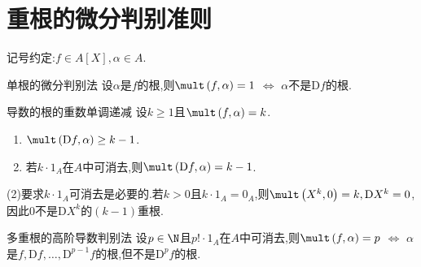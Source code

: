 \section{重根的微分判别准则}

记号约定:$f\in A\left[X\right],\alpha\in A$.

\begin{proposition}{单根的微分判别法}{}
	设$\alpha$是$f$的根,则$\mult\left(f,\alpha\right)=1$ $\iff$ $\alpha$不是$\mathrm{D}f$的根.
\end{proposition}

\begin{proposition}{导数的根的重数单调递减}{}
	设$k\geq 1$且$\mult\left(f,\alpha\right)=k$.
	\begin{enumerate}
		\item $\mult\left(\mathrm{D}f,\alpha\right)\geq k-1$.
		\item 若$k\cdot 1_{A}$在$A$中可消去,则$\mult\left(\mathrm{D}f,\alpha\right)=k-1$.
	\end{enumerate}
\end{proposition}

\begin{remark}{}{}
	(2)要求$k\cdot 1_{A}$可消去是必要的.若$k>0$且$k\cdot 1_{A}=0_{A}$,则$\mult\left(X^{k},0\right)=k,\mathrm{D}X^{k}=0$,因此$0$不是$\mathrm{D}X^{k}$的$\left(k-1\right)$重根.
\end{remark}

\begin{corollary}{多重根的高阶导数判别法}{}
	设$p\in\N$且$p!\cdot 1_{A}$在$A$中可消去,则$\mult\left(f,\alpha\right)=p$ $\iff$ $\alpha$是$f,\mathrm{D}f,\ldots,\mathrm{D}^{p-1}f$的根,但不是$\mathrm{D}^{p}f$的根.
\end{corollary}














